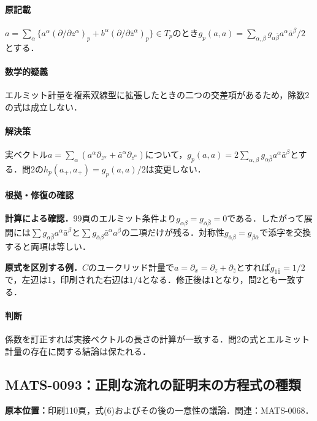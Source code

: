 \documentclass[a4paper,10pt]{ltjsarticle}
\begin{document}
\paragraph{原記載}$a=\sum_\alpha\{a^\alpha(\partial/\partial z^\alpha)_p+b^\alpha(\partial/\partial\bar z^\alpha)_p\}\in T_p$のとき$g_p(a,a)=\sum_{\alpha,\beta}g_{\alpha\bar\beta}a^\alpha\bar a^\beta/2$とする．

\paragraph{数学的疑義}エルミット計量を複素双線型に拡張したときの二つの交差項があるため，除数2の式は成立しない．

\paragraph{解決策}実ベクトル$a=\sum_\alpha(a^\alpha\partial_{z^\alpha}+\bar a^\alpha\partial_{\bar z^\alpha})$について，$g_p(a,a)=2\sum_{\alpha,\beta}g_{\alpha\bar\beta}a^\alpha\bar a^\beta$とする．問2の$h_p(a_+,a_+)=g_p(a,a)/2$は変更しない．

\paragraph{根拠・修復の確認}\textbf{計算による確認．}99頁のエルミット条件より$g_{\alpha\beta}=g_{\bar\alpha\bar\beta}=0$である．したがって展開には$\sum g_{\alpha\bar\beta}a^\alpha\bar a^\beta$と$\sum g_{\bar\alpha\beta}\bar a^\alpha a^\beta$の二項だけが残る．対称性$g_{\bar\alpha\beta}=g_{\beta\bar\alpha}$で添字を交換すると両項は等しい．\par\textbf{原式を区別する例．}$C$のユークリッド計量で$a=\partial_x=\partial_z+\partial_{\bar z}$とすれば$g_{1\bar1}=1/2$で，左辺は1，印刷された右辺は$1/4$となる．修正後は1となり，問2とも一致する．

\paragraph{判断}係数を訂正すれば実接ベクトルの長さの計算が一致する．問2の式とエルミット計量の存在に関する結論は保たれる．


\subsection*{MATS-0093：正則な流れの証明末の方程式の種類}\label{math:MATS-0093}
\noindent\textbf{原本位置：}印刷110頁，式(6)およびその後の一意性の議論．関連：MATS-0068．
\end{document}
